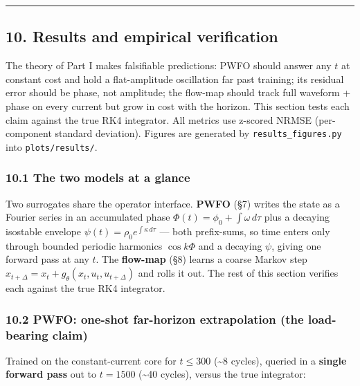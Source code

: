 \documentclass[
  11pt,
]{article}
\begin{document}
\begin{center}\rule{0.5\linewidth}{0.5pt}\end{center}

\subsection{10. Results and empirical
verification}\label{results-and-empirical-verification}

The theory of Part I makes falsifiable predictions: PWFO should answer
any \(t\) at constant cost and hold a flat-amplitude oscillation far
past training; its residual error should be phase, not amplitude; the
flow-map should track full waveform + phase on every current but grow in
cost with the horizon. This section tests each claim against the true
RK4 integrator. All metrics use z-scored NRMSE (per-component standard
deviation). Figures are generated by \texttt{results\_figures.py} into
\texttt{plots/results/}.

\subsubsection{10.1 The two models at a
glance}\label{the-two-models-at-a-glance}

Two surrogates share the operator interface. \textbf{PWFO} (§7) writes
the state as a Fourier series in an accumulated phase
\(\Phi(t)=\phi_0+\int\omega\,d\tau\) plus a decaying isostable envelope
\(\psi(t)=\rho_0 e^{\int\kappa\,d\tau}\) --- both prefix-sums, so time
enters only through bounded periodic harmonics \(\cos k\Phi\) and a
decaying \(\psi\), giving one forward pass at any \(t\). The
\textbf{flow-map} (§8) learns a coarse Markov step
\(x_{t+\Delta}=x_t+g_\theta(x_t,u_t,u_{t+\Delta})\) and rolls it out.
The rest of this section verifies each against the true RK4 integrator.

\subsubsection{10.2 PWFO: one-shot far-horizon extrapolation (the
load-bearing
claim)}\label{pwfo-one-shot-far-horizon-extrapolation-the-load-bearing-claim}

Trained on the constant-current core for \(t\le 300\) (\textasciitilde8
cycles), queried in a \textbf{single forward pass} out to \(t=1500\)
(\textasciitilde40 cycles), versus the true integrator:
\end{document}
